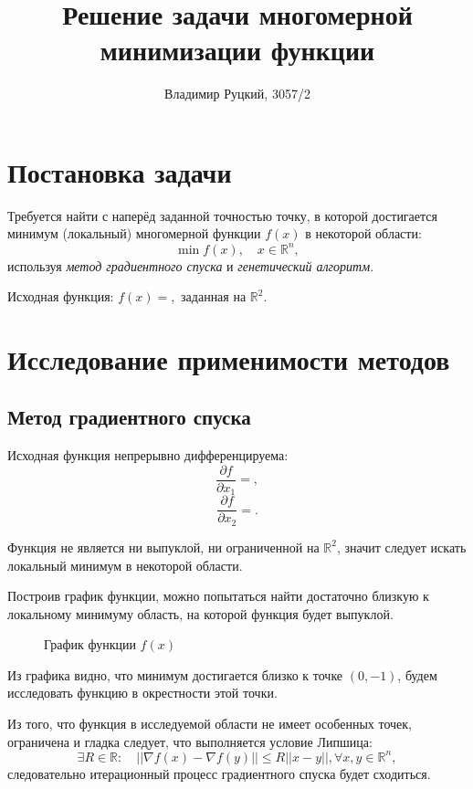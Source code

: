 \documentclass[10pt,a4paper,titlepage]{article}
\title{Решение задачи многомерной минимизации функции}
\author{Владимир Руцкий, 3057/2}
\date{} %
\newcommand\RR{\mathbb{R}}
\begin{document}
\maketitle
\thispagestyle{empty}

\section{Постановка задачи}
Требуется найти с наперёд заданной точностью точку, в которой достигается минимум (локальный) многомерной функции $f(x)$ 
в некоторой области:
$$ \min f(x), \quad x \in \RR^n, $$
используя \textit{метод градиентного спуска} и \textit{генетический алгоритм}.

Исходная функция: $f(x) = ,$ заданная на $\RR^2.$ %

\section{Исследование применимости методов}
\subsection{Метод градиентного спуска}
Исходная функция непрерывно дифференцируема:
$$
  \frac{\partial f}{\partial x_1} = ,
$$
$$
  \frac{\partial f}{\partial x_2} = .
$$

Функция не является ни выпуклой, ни ограниченной на $\RR^2$, значит следует искать локальный минимум в некоторой области.

Построив график функции, можно попытаться найти достаточно близкую к локальному минимуму область, 
на которой функция будет выпуклой.
\begin{figure}[h]
  \label{function-graph}
  \caption{График функции $f(x)$}
  \begin{center}
  
  \end{center}
\end{figure}

Из графика видно, что минимум достигается близко к точке $(0, -1)$, будем исследовать функцию в окрестности этой точки.

Из того, что функция в исследуемой области не имеет особенных точек, ограничена и гладка следует, 
что выполняется условие Липшица:
$$
  \exists R \in \RR: \quad \left|\left| \nabla f(x) - \nabla f(y) \right|\right| \leqslant R || x - y ||, \forall x, y \in \RR^n,
$$
следовательно итерационный процесс градиентного спуска будет сходиться.
\end{document}
